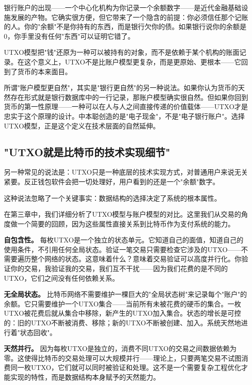 \documentclass[a4paper,12pt,openany]{ctexbook}
\begin{document}
银行账户的出现——一个中心化机构为你记录一个余额数字——是近代金融基础设施发展的产物。它确实很方便，但它带来了一个隐含的前提：你必须信任那个记账的人。你的"余额"不是你持有的东西，而是银行欠你的债。如果银行说你的余额是0，你手里没有任何"东西"可以证明它错了。

UTXO模型把"钱"还原为一种可以被持有的对象，而不是依赖于某个机构的账面记录。在这个意义上，UTXO不是比账户模型更复杂，而是更原始、更根本——它回到了货币的本来面目。

所谓"账户模型更自然"，其实是"银行更自然"的另一种说法。如果你认为货币的天然存在形式就是银行数据库中的一行记录，那账户模型确实很自然。但如果你回到货币的第一性原理——一种可以在人与人之间直接传递的价值载体——UTXO才是忠实于这个原理的设计。中本聪创造的是"电子现金"，不是"电子银行账户"。选择UTXO模型，正是这个定义在技术层面的自然延伸。


\subsection*{"UTXO就是比特币的技术实现细节"}


另一种常见的说法是：UTXO只是一种底层的技术实现方式，对普通用户来说无关紧要。反正钱包软件会把一切处理好，用户看到的还是一个"余额"数字。

这种说法忽略了一个关键事实：数据结构的选择决定了系统的根本属性。

在第三章中，我们详细分析了UTXO模型与账户模型的对比。这里我们从交易的角度做一个简要的回顾，因为这些属性直接关系到比特币作为支付系统的能力。

\textbf{自包含性。} 每枚UTXO是一个独立的状态单元。它知道自己的面值，知道自己的使用条件，不引用任何全局状态。验证一笔交易只需要检查它涉及的UTXO——不需要遍历整个网络的状态。这意味着什么？意味着交易验证可以高度并行化。你验证你的交易，我验证我的交易，我们互不干扰——因为我们花费的是不同的UTXO，它们之间没有任何依赖关系。

\textbf{无全局状态。} 比特币网络不需要维护一棵巨大的"全局状态树"来记录每个"账户"的余额。它只需要维护一个UTXO集合——当前所有未被花费的硬币的集合。一枚UTXO被花费后就从集合中移除，新产生的UTXO加入集合。状态的增长是可控的：旧的UTXO不断被消费、移除；新的UTXO不断被创建、加入。系统天然地进行着"状态回收"。

\textbf{天然并行。} 因为每枚UTXO是独立的，消费不同UTXO的交易之间数据依赖为零。这使得比特币的交易处理可以大规模并行——理论上，只要两笔交易不试图消费同一枚UTXO，它们就可以同时被验证和处理。这不是一个需要复杂工程优化才能实现的特性，而是数据结构本身赋予的天然能力。
\end{document}
